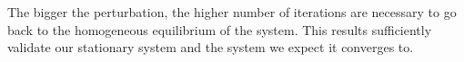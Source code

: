 The bigger the perturbation, the higher number of iterations are necessary to go back to the homogeneous equilibrium of the system. This results sufficiently validate our stationary system and the system we expect it converges to.

